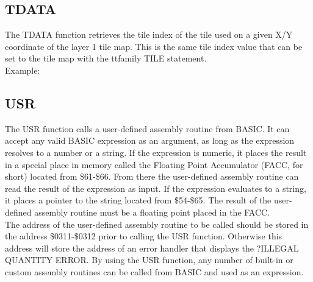 \subsection{TDATA}

The {\ttfamily TDATA} function retrieves the tile index of the tile used on a
given X/Y coordinate of the layer 1 tile map.  This is the same tile index
value that can be set to the tile map with the {ttfamily TILE} statement.\\

Example:\\


\subsection{USR}

The {\ttfamily USR} function calls a user-defined assembly routine from BASIC.
It can accept any valid BASIC expression as an argument, as long as the
expression resolves to a number or a string.  If the expression is numeric, it
places the result in a special place in memory called the Floating Point
Accumulator (FACC, for short) located from {\ttfamily \$61-\$66}.  From there
the user-defined assembly routine can read the result of the expression as
input.  If the expression evaluates to a string, it places a pointer to the
string located from {\ttfamily \$54-\$65}.  The result of the user-defined
assembly routine must be a floating point placed in the FACC.\\

The address of the user-defined assembly routine to be called should be stored
in the address {\ttfamily \$0311-\$0312} prior to calling the {\ttfamily USR}
function.  Otherwise this address will store the address of an error handler
that displays the {\ttfamily ?ILLEGAL QUANTITY ERROR}.  By using the {\ttfamily
USR} function, any number of built-in or custom assembly routines can be called
from BASIC and used as an expression.\\

